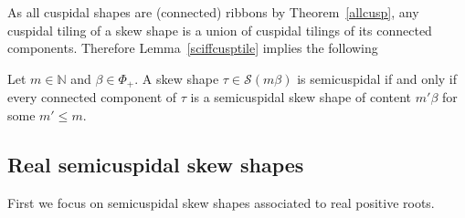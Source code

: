 \documentclass[Unicode,ALCO]{cedram}
\newcommand{\SSSS}{\mathcal{S}}
\newcommand{\0}{{\bar 0}}
\newcommand{\NN}{{\mathbb N}}
\begin{document}
As all cuspidal shapes are (connected) ribbons by Theorem~\ref{allcusp}, any cuspidal tiling of a skew shape is a union of cuspidal tilings of its connected components. Therefore Lemma~\ref{sciffcusptile} implies the following

\begin{coro}\label{concompsc}
Let \(m \in \NN\) and \(\beta \in \Phi_+\). A skew shape \(\tau \in \SSSS(m \beta)\) is semicuspidal if and only if every connected component of \(\tau\) is a semicuspidal skew shape of content \(m'\beta\) for some \(m' \leq m\). 
\end{coro}

\subsection{Real semicuspidal skew shapes} First we focus on semicuspidal skew shapes associated to real positive roots.
\end{document}
